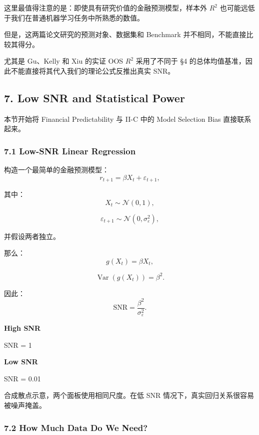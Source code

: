 这里最值得注意的是：即使具有研究价值的金融预测模型，样本外 \(R^2\) 也可能远低于我们在普通机器学习任务中所熟悉的数值。

但是，这两篇论文研究的预测对象、数据集和 Benchmark 并不相同，不能直接比较其得分。

尤其是 Gu、Kelly 和 Xiu 的实证 OOS \(R^2\) 采用了不同于 §4 的总体均值基准，因此不能直接将其代入我们的理论公式反推出真实 SNR。

\hypertarget{part-4-60-0001-low-snr-and-statistical-power}{%
\subsection{7. Low SNR and Statistical Power}\label{part-4-60-0001-low-snr-and-statistical-power}}

本节开始将 Financial Predictability 与 II-C 中的 Model Selection Bias 直接联系起来。

\hypertarget{part-4-60-0001-low-snr-linear-regression}{%
\subsubsection{7.1 Low-SNR Linear Regression}\label{part-4-60-0001-low-snr-linear-regression}}

构造一个最简单的金融预测模型：
\[r_{t+1}
=
\beta X_t+\varepsilon_{t+1},\]

其中：
\[X_t\sim\mathcal N(0,1),\]

\[\varepsilon_{t+1}
\sim\mathcal N(0,\sigma_\varepsilon^2),\]

并假设两者独立。

那么：
\[g(X_t)=\beta X_t,\]

\[\operatorname{Var}(g(X_t))=\beta^2.\]

因此：
\[\boxed{
\mathrm{SNR}
=
\frac{\beta^2}{\sigma_\varepsilon^2}.
}\]

\textbf{High SNR}


SNR = 1

\textbf{Low SNR}


SNR = 0.01

合成散点示意，两个面板使用相同尺度。在低 SNR 情况下，真实回归关系很容易被噪声掩盖。

\hypertarget{part-4-60-0001-how-much-data-do-we-need}{%
\subsubsection{7.2 How Much Data Do We Need?}\label{part-4-60-0001-how-much-data-do-we-need}}

